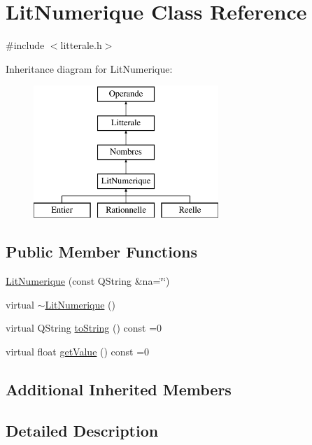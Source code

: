 \hypertarget{class_lit_numerique}{}\section{Lit\+Numerique Class Reference}
\label{class_lit_numerique}


{\ttfamily \#include $<$litterale.\+h$>$}

Inheritance diagram for Lit\+Numerique\+:\begin{figure}[H]
\begin{center}
\leavevmode
\includegraphics[height=5.000000cm]{class_lit_numerique}
\end{center}
\end{figure}
\subsection*{Public Member Functions}
\begin{DoxyCompactItemize}
\item 
\hyperlink{class_lit_numerique_a156cf838921ef4b54a1ce60d450dc32e}{Lit\+Numerique} (const Q\+String \&na=\char`\"{}\char`\"{})
\item 
virtual \hyperlink{class_lit_numerique_a7b49818486bc94d0a2fe5fb503184dd5}{$\sim$\+Lit\+Numerique} ()
\item 
virtual Q\+String \hyperlink{class_lit_numerique_a6e3c66f0b484c5be954eb788a95c0d16}{to\+String} () const  =0
\item 
virtual float \hyperlink{class_lit_numerique_ae7ecb1f7671754bc2155e35428e21124}{get\+Value} () const  =0
\end{DoxyCompactItemize}
\subsection*{Additional Inherited Members}


\subsection{Detailed Description}


